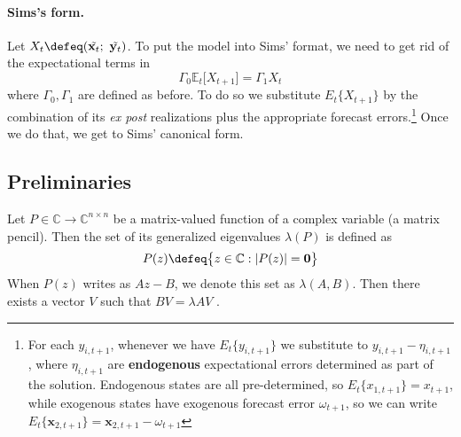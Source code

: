 \documentclass[a4paper,10pt]{article}  %
\begin{document}
\paragraph{\normalfont\bf Sims's form.} %
\label{par:sims_form}

Let $X_t \defeq ( \tilde{\mathbf{x}_t}; \ \tilde{\mathbf{y}_t} )$. To put the model into Sims' format, we need to get rid of
the expectational terms in
\begin{equation*}
   \Gamma_0 \mathbb{E}_t \Big[ X_{t+1} \Big] = \Gamma_1 X_t
\end{equation*}
where $ \Gamma_0, \Gamma_1$ are defined as before. To do so we substitute $ E_{t} \big\{X_{t+1}\big\} $ by the
combination of its \emph{ex post} realizations plus the appropriate forecast errors.\footnote{%
   For each $y_{i,t+1}$, whenever we have $ E_{t} \big\{ y_{i,t+1} \big\}  $  we substitute to $ y_{i,t+1} - \eta_{i,t+1}$, 
   where $\eta_{i,t+1} $  are \textbf{endogenous} expectational errors determined as part of the solution.
   Endogenous states are all pre-determined, so $ E_t\{x_{1,t+1}\} = x_{t+1} $, while exogenous states have exogenous
   forecast error $ \omega_{t+1} $, so we can write $ E_t \{\mathbf{x}_{2,t+1} \} = \mathbf{x}_{2,t+1} - \omega_{t+1}$
   }
Once we do that, we get to Sims' canonical form.

\subsection{Preliminaries} %
\label{sub:preliminaries}

\begin{definition}
   Let $ P\in \mathbb{C}\rightarrow \mathbb{C}^{n\times n} $ be a matrix-valued function of a complex variable (a matrix
pencil). Then the set of its generalized eigenvalues $ \lambda( P) $ is defined as
\[
   P(z) \defeq \big\{ z\in \mathbb{C}: \lvert P(z) \rvert = \mathbf{0} \big\}
\]
When $P(z)$ writes as $Az-B$, we denote this set as $\lambda(A,B)$. Then there exists
a vector $V$ such that $BV = \lambda AV$ .
\end{definition}
\end{document}
